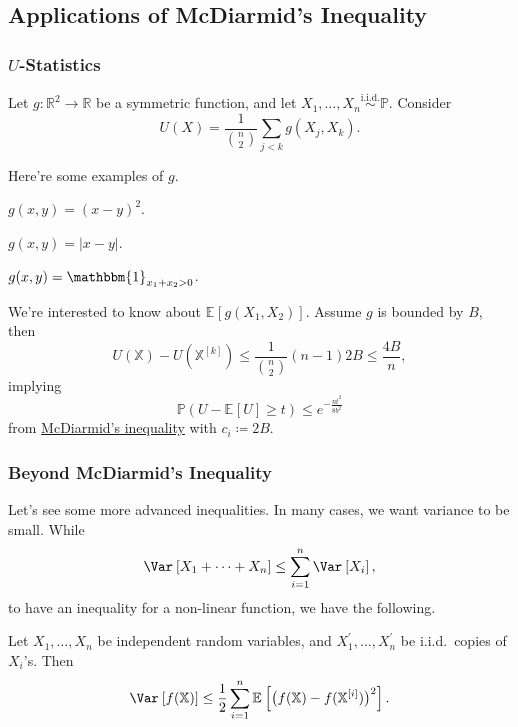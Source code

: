 \subsection{Applications of McDiarmid's Inequality}
\subsubsection{\(U\)-Statistics}

Let \(g\colon \mathbb{R} ^2 \to \mathbb{R} \) be a symmetric function, and let \(X_1, \dots , X_n \overset{\text{i.i.d.} }{\sim } \mathbb{P} \). Consider
\[
	U(X) = \frac{1}{\binom{n}{2}} \sum_{j < k} g(X_j, X_k).
\]

Here're some examples of \(g\).
\begin{eg}
	\(g(x, y) = (x - y)^2\).
\end{eg}

\begin{eg}
	\(g(x, y) = \vert x - y \vert \).
\end{eg}

\begin{eg}
	\(g(x, y) = \mathbbm{1}_{x_1 + x_2 > 0} \).
\end{eg}

We're interested to know about \(\mathbb{E}_{}\left[g(X_1, X_2) \right] \). Assume \(g\) is bounded by \(B\), then
\[
	U(\mathbb{X}) - U(\mathbb{X}^{[k]}) \leq \frac{1}{\binom{n}{2}} (n-1) 2B \leq \frac{4B}{n},
\]
implying
\[
	\mathbb{P} (U - \mathbb{E}_{}\left[U \right] \geq t) \leq e^{-\frac{nt^2}{8b^2}}
\]
from \hyperref[thm:McDiarmid-inequality]{McDiarmid's inequality} with \(c_i \coloneqq 2B\).

\subsubsection{Beyond McDiarmid's Inequality}
Let's see some more advanced inequalities. In many cases, we want variance to be small. While
\[
	\Var_{}\left[X_1 + \dots + X_n \right] \leq \sum_{i=1}^{n} \Var_{}\left[X_i \right],
\]
to have an inequality for a non-linear function, we have the following.

\begin{theorem}\label{thm:Efron-Stein-inequality}
	Let \(X_1, \dots , X_n\) be independent random variables, and \(X_1^{\prime} , \dots , X_n^{\prime} \) be i.i.d.\ copies of \(X_i\)'s. Then
	\[
		\Var_{}\left[f(\mathbb{X}) \right] \leq \frac{1}{2} \sum_{i=1}^{n} \mathbb{E}_{}\left[\big(f(\mathbb{X}) - f(\mathbb{X}^{[i]}) \big)^2 \right].
	\]
\end{theorem}

